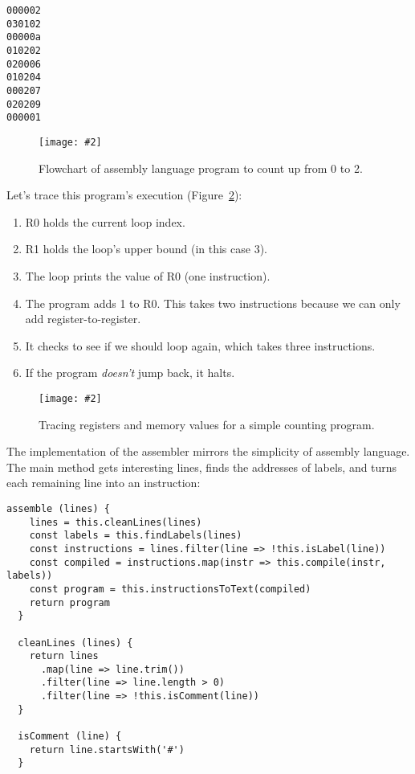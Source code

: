 \documentclass[krantzl]{krantz}
\newcommand{\figpdf}[4]{\begin{figure}%
\centering%
\texttt{[image: \#2]}%
\caption{#3}%
\label{#1}%
\end{figure}}
\newcommand{\figref}[1]{Figure~\ref{#1}}
\begin{document}
\begin{lstlisting}[frame=tblr]
000002
030102
00000a
010202
020006
010204
000207
020209
000001
\end{lstlisting}


\figpdf{virtual-machine-count-up}{./virtual-machine/count-up.pdf}{Flowchart of assembly language program to count up from 0 to 2.}{0.6}


Let’s trace this program’s execution
(\figref{virtual-machine-trace-counter}):

\begin{enumerate}

\item R0 holds the current loop index.

\item R1 holds the loop’s upper bound (in this case 3).

\item The loop prints the value of R0 (one instruction).

\item The program adds 1 to R0.
    This takes two instructions because we can only add register-to-register.

\item It checks to see if we should loop again,
    which takes three instructions.

\item If the program \emph{doesn’t} jump back, it halts.

\end{enumerate}

\figpdf{virtual-machine-trace-counter}{./virtual-machine/trace-counter.pdf}{Tracing registers and memory values for a simple counting program.}{0.6}


\noindent The implementation of the assembler mirrors the simplicity of assembly language.
The main method gets interesting lines,
finds the addresses of labels,
and turns each remaining line into an instruction:


\begin{lstlisting}[frame=tblr]
  assemble (lines) {
    lines = this.cleanLines(lines)
    const labels = this.findLabels(lines)
    const instructions = lines.filter(line => !this.isLabel(line))
    const compiled = instructions.map(instr => this.compile(instr, labels))
    const program = this.instructionsToText(compiled)
    return program
  }

  cleanLines (lines) {
    return lines
      .map(line => line.trim())
      .filter(line => line.length > 0)
      .filter(line => !this.isComment(line))
  }

  isComment (line) {
    return line.startsWith('#')
  }
\end{lstlisting}
\end{document}
